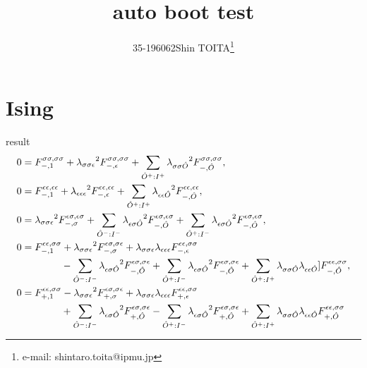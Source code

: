 \documentclass[dvipdfmx]{jsarticle}
\title{auto boot test}
\author{35-196062\hspace{15pt}Shin TOITA\thanks{e-mail: shintaro.toita@ipmu.jp}}
\newcommand{\op}[1]{\hat{#1}}
\begin{document}
\maketitle
\vspace{-4zh}
\section{Ising}
result
\begin{align}
  0&=F^{\sigma \sigma,\sigma \sigma}_{-,1}
    +{\lambda_{\sigma \sigma \epsilon}}^2 
      F^{\sigma \sigma,\sigma \sigma}_{-,\epsilon}
    +\sum_{\op{O}^+:{I^+}}{\lambda_{\sigma \sigma \op{O}}}^2 
      F^{\sigma \sigma,\sigma \sigma}_{-,\op{O}}
,\\
  0&=F^{\epsilon \epsilon,\epsilon \epsilon}_{-,1}
    +{\lambda_{\epsilon \epsilon \epsilon}}^2 
      F^{\epsilon \epsilon,\epsilon \epsilon}_{-,\epsilon}
    +\sum_{\op{O}^+:{I^+}}{\lambda_{\epsilon \epsilon \op{O}}}^2 
      F^{\epsilon \epsilon,\epsilon \epsilon}_{-,\op{O}}
,\\
  0&={\lambda_{\sigma \sigma \epsilon}}^2 
    F^{\epsilon \sigma,\epsilon \sigma}_{-,\sigma}
  +\sum_{\op{O}^-:{I^-}}{\lambda_{\epsilon \sigma \op{O}}}^2 
    F^{\epsilon \sigma,\epsilon \sigma}_{-,\op{O}}
  +\sum_{\op{O}^+:{I^-}}{\lambda_{\epsilon \sigma \op{O}}}^2 
    F^{\epsilon \sigma,\epsilon \sigma}_{-,\op{O}}
,\\
  0&=F^{\epsilon \epsilon,\sigma \sigma}_{-,1}
    +{\lambda_{\sigma \sigma \epsilon}}^2 
      F^{\epsilon \sigma,\sigma \epsilon}_{-,\sigma}
    +\lambda_{\sigma \sigma \epsilon} \lambda_{\epsilon \epsilon \epsilon} 
      F^{\epsilon \epsilon,\sigma \sigma}_{-,\epsilon}
\notag\\&\qquad\qquad
      -\sum_{\op{O}^-:{I^-}}{\lambda_{\epsilon \sigma \op{O}}}^2 
      F^{\epsilon \sigma,\sigma \epsilon}_{-,\op{O}}
    +\sum_{\op{O}^+:{I^-}}{\lambda_{\epsilon \sigma \op{O}}}^2 
      F^{\epsilon \sigma,\sigma \epsilon}_{-,\op{O}}
    +\sum_{\op{O}^+:{I^+}}\lambda_{\sigma \sigma \op{O}} 
      \lambda_{\epsilon \epsilon \op{O}} ]
      F^{\epsilon \epsilon,\sigma \sigma}_{-,\op{O}}
,\\
  0&=F^{\epsilon \epsilon,\sigma \sigma}_{+,1}
    -{\lambda_{\sigma \sigma \epsilon}}^2 
      F^{\epsilon \sigma,\sigma \epsilon}_{+,\sigma}
    +\lambda_{\sigma \sigma \epsilon} \lambda_{\epsilon \epsilon \epsilon} 
      F^{\epsilon \epsilon,\sigma \sigma}_{+,\epsilon}
\notag\\&\qquad\qquad
      +\sum_{\op{O}^-:{I^-}}{\lambda_{\epsilon \sigma \op{O}}}^2 
      F^{\epsilon \sigma,\sigma \epsilon}_{+,\op{O}}
    -\sum_{\op{O}^+:{I^-}}{\lambda_{\epsilon \sigma \op{O}}}^2 
      F^{\epsilon \sigma,\sigma \epsilon}_{+,\op{O}}
    +\sum_{\op{O}^+:{I^+}}\lambda_{\sigma \sigma \op{O}} 
      \lambda_{\epsilon \epsilon \op{O}} 
        F^{\epsilon \epsilon,\sigma \sigma}_{+,\op{O}}
\end{align}
\end{document}
